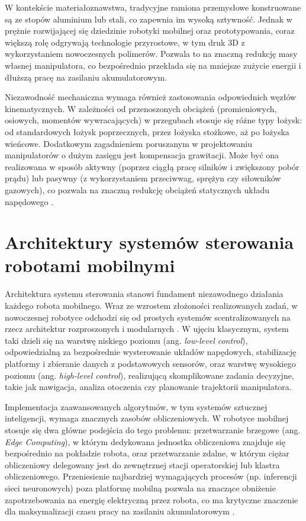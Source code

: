 \documentclass[11pt]{extreport}
\begin{document}
W kontekście materiałoznawstwa, tradycyjne ramiona przemysłowe konstruowane są ze stopów aluminium lub stali, co zapewnia im wysoką sztywność. Jednak w prężnie rozwijającej się dziedzinie robotyki mobilnej oraz prototypowania, coraz większą rolę odgrywają technologie przyrostowe, w tym druk 3D z wykorzystaniem nowoczesnych polimerów. Pozwala to na znaczną redukcję masy własnej manipulatora, co bezpośrednio przekłada się na mniejsze zużycie energii i dłuższą pracę na zasilaniu akumulatorowym.

Niezawodność mechaniczna wymaga również zastosowania odpowiednich węzłów kinematycznych. W zależności od przenoszonych obciążeń (promieniowych, osiowych, momentów wywracających) w przegubach stosuje się różne typy łożysk: od standardowych łożysk poprzecznych, przez łożyska stożkowe, aż po łożyska wieńcowe. Dodatkowym zagadnieniem poruszanym w projektowaniu manipulatorów o dużym zasięgu jest kompensacja grawitacji. Może być ona realizowana w sposób aktywny (poprzez ciągłą pracę silników i zwiększony pobór prądu) lub pasywny (z wykorzystaniem przeciwwag, sprężyn czy siłowników gazowych), co pozwala na znaczną redukcję obciążeń statycznych układu napędowego \cite{siciliano2016springer}.

\section{Architektury systemów sterowania robotami mobilnymi}

Architektura systemu sterowania stanowi fundament niezawodnego działania każdego robota mobilnego. Wraz ze wzrostem złożoności realizowanych zadań, w nowoczesnej robotyce odchodzi się od prostych systemów scentralizowanych na rzecz architektur rozproszonych i modularnych \cite{siciliano2016springer}. W ujęciu klasycznym, system taki dzieli się na warstwę niskiego poziomu (ang. \textit{low-level control}), odpowiedzialną za bezpośrednie wysterowanie układów napędowych, stabilizację platformy i zbieranie danych z podstawowych sensorów, oraz warstwę wysokiego poziomu (ang. \textit{high-level control}), realizującą skomplikowane zadania decyzyjne, takie jak nawigacja, analiza otoczenia czy planowanie trajektorii manipulatora.

Implementacja zaawansowanych algorytmów, w tym systemów sztucznej inteligencji, wymaga znacznych zasobów obliczeniowych. W robotyce mobilnej stosuje się dwa główne podejścia do tego problemu: przetwarzanie brzegowe (ang. \textit{Edge Computing}), w którym dedykowana jednostka obliczeniowa znajduje się bezpośrednio na pokładzie robota, oraz przetwarzanie zdalne, w którym ciężar obliczeniowy delegowany jest do zewnętrznej stacji operatorskiej lub klastra obliczeniowego. Przeniesienie najbardziej wymagających procesów (np. inferencji sieci neuronowych) poza platformę mobilną pozwala na znaczące obniżenie zapotrzebowania na energię elektryczną przez robota, co ma krytyczne znaczenie dla maksymalizacji czasu pracy na zasilaniu akumulatorowym \cite{siciliano2016springer}.
\end{document}
